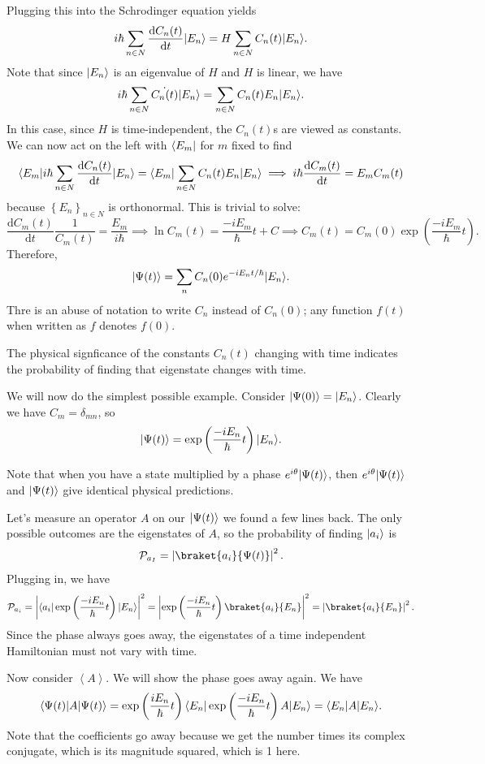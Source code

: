Plugging this into the Schrodinger equation yields
\[
	i\hbar \sum_{n\in N} \frac{\mathrm{d}C_n(t)}{\mathrm{d}t} \lvert E_n\rangle =H \sum_{n\in N} C_n(t)\lvert E_n\rangle 
.\]
Note that since $\lvert E_n\rangle $ is an eigenvalue of $H$ and $H$ is linear, we have
\[
	i\hbar \sum_{n\in N} \dot{C_n(t)} \lvert E_n\rangle =\sum_{n\in N} C_n(t)E_n\lvert E_n\rangle 
.\]
In this case, since $H$ is time-independent, the $C_n(t)$s are viewed as constants. We can now act on the left with $\langle E_m\rvert $ for $m$ fixed to find
\[
	\langle E_m\rvert i\hbar \sum_{n\in N} \frac{\mathrm{d}C_n(t)}{\mathrm{d}t}  \lvert E_n\rangle =\langle E_m\rvert\sum_{n\in N} C_n(t)E_n\lvert E_n\rangle \implies i\hbar \frac{\mathrm{d}C_m(t)}{\mathrm{d}t}  =E_mC_m(t)
\]
because $\left\{ E_n \right\}_{n\in N} $ is orthonormal. This is trivial to solve:
\[
	\frac{\mathrm{d}C_m(t)}{\mathrm{d}t} \frac{1}{C_m(t)} =\frac{E_m}{i\hbar } \implies \ln C_m(t)=\frac{-iE_m}{\hbar }t+C \implies C_m(t)=C_m(0)\exp \left( \frac{-i E_m}{\hbar }t  \right)
.\]
Therefore,
\[
	\lvert\Psi (t)\rangle =\sum_{n} C_n(0)e^{-i E_nt/\hbar} \lvert E_n\rangle
.\]
Thre is an abuse of notation to write $C_n$ instead of $C_n(0)$; any function $f(t)$ when written as $f$ denotes $f(0)$.

The physical signficance of the constants $C_n(t)$ changing with time indicates the probability of finding that eigenstate changes with time.

We will now do the simplest possible example. Consider $\lvert\Psi (0)\rangle =\lvert E_n\rangle $. Clearly we have $C_m=\delta_{mn} $, so
\[
	\lvert\Psi (t)\rangle =\exp \left( \frac{-iE_n}{\hbar } t \right) \lvert E_n\rangle 
.\]

Note that when you have a state multiplied by a phase $e^{i\theta } \lvert\Psi (t)\rangle $, then $e^{i\theta } \lvert\Psi (t)\rangle $ and $\lvert\Psi (t)\rangle $ give identical physical predictions.

Let's measure an operator $A$ on our $\lvert\Psi (t)\rangle $ we found a few lines back. The only possible outcomes are the eigenstates of $A$, so the probability of finding $\lvert a_i\rangle $ is
\[
	\mathcal{P}_{a_I} =\left| \braket{a_i}{\Psi (t)}  \right| ^2
.\]
Plugging in, we have
\[
	\mathcal{P}_{a_i} =\left| \bra{a_i}\exp \left( \frac{-iE_n}{\hbar } t \right) \ket{E_n}  \right| ^2=\left| \exp \left( \frac{-iE_n}{\hbar } t \right) \braket{a_i}{E_n}  \right| ^2=\left| \braket{a_i}{E_n}  \right| ^2
.\]
Since the phase always goes away, the eigenstates of a time independent Hamiltonian must not vary with time.

Now consider $\left\langle A \right\rangle $. We will show the phase goes away again. We have
\[
	\langle\Psi (t)\rvert A\lvert\Psi (t)\rangle =\exp \left( \frac{iE_n}{\hbar } t \right) \langle E_n\rvert \exp \left( \frac{-iE_n}{\hbar } t \right) A\lvert E_n\rangle =\langle E_n\rvert A\lvert E_n\rangle 
.\]
Note that the coefficients go away because we get the number times its complex conjugate, which is its magnitude squared, which is 1 here.

